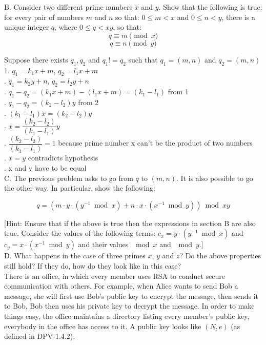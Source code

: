 \documentclass{article}
\begin{document}
\noindent B. Consider two different prime numbers $x$ and $y$. Show that the
following is true: for every pair of numbers $m$ and $n$ so that: $0
\leq m < x$ and $0 \leq n < y$, there is a unique integer $q$, where
$0 \leq q < xy$, so that:
$$q \equiv m \pmod{x}$$
$$q \equiv n \pmod{y}$$

Suppose there exists $q_1, q_2$ and $q_1 != q_2$ such that $q_1 = (m, n)$ and $q_2 = (m, n)$\\

1. $q_1 = k_1x+m$, $q_2 = l_1x+m$\\
. $q_1 = k_2y+n$, $q_2 = l_2y+n$\\
. $q_1 - q_2 = (k_1x + m) - (l_1x + m) = (k_1 - l_1)$ from 1\\
. $q_1 - q_2 = (k_2 - l_2) y$ from 2\\
. $(k_1 - l_1)x = (k_2 - l_2)y$\\
. $x=\dfrac{(k_2 - l_2)}{(k_1 - l_1)}y$\\
. $\dfrac{(k_2 - l_2)}{(k_1 - l_1)} = 1$ because prime number x can't be the product of two numbers\\
. $x = y$ contradicts hypothesis\\
. x and y have to be equal\\
  
\noindent C. The previous problem asks to go from $q$ to $(m,n)$. It is also
possible to go the other way. In particular, show the following:

$$q = ( m \cdot y \cdot (y^{-1} \bmod{x}) + n \cdot x \cdot
(x^{-1} \bmod{y}) ) \bmod{xy}$$

[Hint: Ensure that if the above is true then the expressions in section B are
  also true. Consider the values of the following terms: $c_x = y
  \cdot (y^{-1} \bmod{x})$ and $c_y = x \cdot (x^{-1} \bmod{y})$ and
their values $\mod{x}$ and $\mod{y}$.]\\

\noindent D. What happens in the case of three primes $x$, $y$ and $z$? Do the
above properties still hold? If they do, how do they look like in this
case?\\



 There is an office, in which every member
uses RSA to conduct secure communication with others.  For example,
when Alice wants to send Bob a message, she will first use Bob's
public key to encrypt the message, then sends it to Bob, Bob then uses
his private key to decrypt the message.  In order to make things easy,
the office maintains a directory listing every member's public key,
everybody in the office has access to it. A public key looks like $(N,
e)$ (as defined in DPV-1.4.2).
\end{document}
